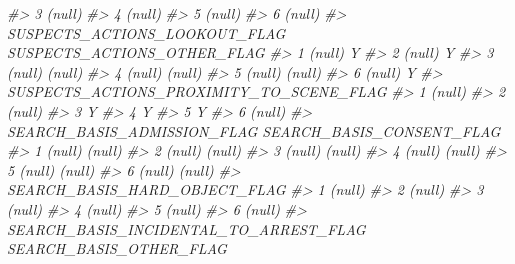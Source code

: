 \documentclass[
]{krantz}
\makeatletter
\newenvironment{Shaded}{\begin{snugshade}}{\end{snugshade}}
\newcommand{\CommentTok}[1]{\textcolor[rgb]{0.37,0.37,0.37}{\textit{#1}}}
\newenvironment{kframe}{%
\medskip{}
\setlength{\fboxsep}{.8em}
 \def\at@end@of@kframe{}%
 \ifinner\ifhmode%
  \def\at@end@of@kframe{\end{minipage}}%
  \begin{minipage}{\columnwidth}%
 \fi\fi%
 \def\FrameCommand##1{\hskip\@totalleftmargin \hskip-\fboxsep
 \colorbox{shadecolor}{##1}\hskip-\fboxsep
     \hskip-\linewidth \hskip-\@totalleftmargin \hskip\columnwidth}%
 \MakeFramed {\advance\hsize-\width
   \@totalleftmargin\z@ \linewidth\hsize
   \@setminipage}}%
 {\par\unskip\endMakeFramed%
 \at@end@of@kframe}
\renewenvironment{Shaded}{\begin{kframe}}{\end{kframe}}
\makeatother
\begin{document}
\begin{Shaded}
\begin{Highlighting}[]
\CommentTok{\#\textgreater{} 3                                       (null)}
\CommentTok{\#\textgreater{} 4                                       (null)}
\CommentTok{\#\textgreater{} 5                                       (null)}
\CommentTok{\#\textgreater{} 6                                       (null)}
\CommentTok{\#\textgreater{}   SUSPECTS\_ACTIONS\_LOOKOUT\_FLAG SUSPECTS\_ACTIONS\_OTHER\_FLAG}
\CommentTok{\#\textgreater{} 1                        (null)                           Y}
\CommentTok{\#\textgreater{} 2                        (null)                           Y}
\CommentTok{\#\textgreater{} 3                        (null)                      (null)}
\CommentTok{\#\textgreater{} 4                        (null)                      (null)}
\CommentTok{\#\textgreater{} 5                        (null)                      (null)}
\CommentTok{\#\textgreater{} 6                        (null)                           Y}
\CommentTok{\#\textgreater{}   SUSPECTS\_ACTIONS\_PROXIMITY\_TO\_SCENE\_FLAG}
\CommentTok{\#\textgreater{} 1                                   (null)}
\CommentTok{\#\textgreater{} 2                                   (null)}
\CommentTok{\#\textgreater{} 3                                        Y}
\CommentTok{\#\textgreater{} 4                                        Y}
\CommentTok{\#\textgreater{} 5                                        Y}
\CommentTok{\#\textgreater{} 6                                   (null)}
\CommentTok{\#\textgreater{}   SEARCH\_BASIS\_ADMISSION\_FLAG SEARCH\_BASIS\_CONSENT\_FLAG}
\CommentTok{\#\textgreater{} 1                      (null)                    (null)}
\CommentTok{\#\textgreater{} 2                      (null)                    (null)}
\CommentTok{\#\textgreater{} 3                      (null)                    (null)}
\CommentTok{\#\textgreater{} 4                      (null)                    (null)}
\CommentTok{\#\textgreater{} 5                      (null)                    (null)}
\CommentTok{\#\textgreater{} 6                      (null)                    (null)}
\CommentTok{\#\textgreater{}   SEARCH\_BASIS\_HARD\_OBJECT\_FLAG}
\CommentTok{\#\textgreater{} 1                        (null)}
\CommentTok{\#\textgreater{} 2                        (null)}
\CommentTok{\#\textgreater{} 3                        (null)}
\CommentTok{\#\textgreater{} 4                        (null)}
\CommentTok{\#\textgreater{} 5                        (null)}
\CommentTok{\#\textgreater{} 6                        (null)}
\CommentTok{\#\textgreater{}   SEARCH\_BASIS\_INCIDENTAL\_TO\_ARREST\_FLAG SEARCH\_BASIS\_OTHER\_FLAG}

\end{Highlighting}
\end{Shaded}
\end{document}
